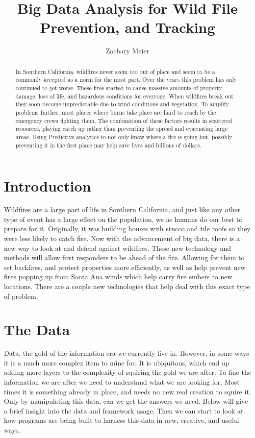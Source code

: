 \documentclass[sigconf]{acmart}
\begin{document}
\title{Big Data Analysis for Wild File Prevention, and Tracking}
\author{Zachary Meier}
\renewcommand{\shortauthors}{Z. Meier et al.}
\begin{abstract}
In Southern California, wildfires never seem too out of place and seem to be a commonly accepted as a norm for the most part.
Over the years this problem has only continued to 
get worse. These fires started to cause massive amounts of property 
damage, loss of life, and hazardous conditions for everyone.  When 
wildfires break out they soon become unpredictable due to wind 
conditions and vegetation.  To amplify problems further, most places 
where burns take place are hard to reach by the emergency crews 
fighting them.  The combination of these factors results in scattered 
resources, playing catch up rather than preventing the spread and 
evacuating large areas.  Using Predictive analytics to not only know 
where a fire is going but, possibly preventing it in the first place 
may help save lives and billions of dollars.
\end{abstract}
\maketitle
\section{Introduction}
Wildfires are a large part of life in Southern California, and just 
like any other type of event has a large effect on the population, we 
as humans do our best to prepare for it.   Originally, it was building 
houses with stucco and tile roofs so they were less likely to catch 
fire. Now with the advancement of big data, there is a new way to look 
at and defend against wildfires.  These new technology and methods will 
allow first responders to be ahead of the fire.  Allowing for them to 
set backfires, and protect properties more efficiently, as well as help 
prevent new fires popping up from Santa Ana winds which help carry fire 
embers to new locations. There are a couple new technologies that help 
deal with this exact type of problem.
\section{The Data}
Data, the gold of the information era we currently live in. However, in 
some ways it is a much more complex item to mine for.  It is 
ubiquitous, which end up adding more layers to the complexity of 
squiring the gold we are after. To fine the information we are after we 
need to understand what we are looking for.  Most times it is something 
already in place, and needs no new real creation to squire it.  Only by 
manipulating this data, can we get the answers we need.  Below will 
give a brief insight into the data and framework usage.  Then we can 
start to look at how programs are being built to harness this data in 
new, creative, and useful ways. 
\end{document}
